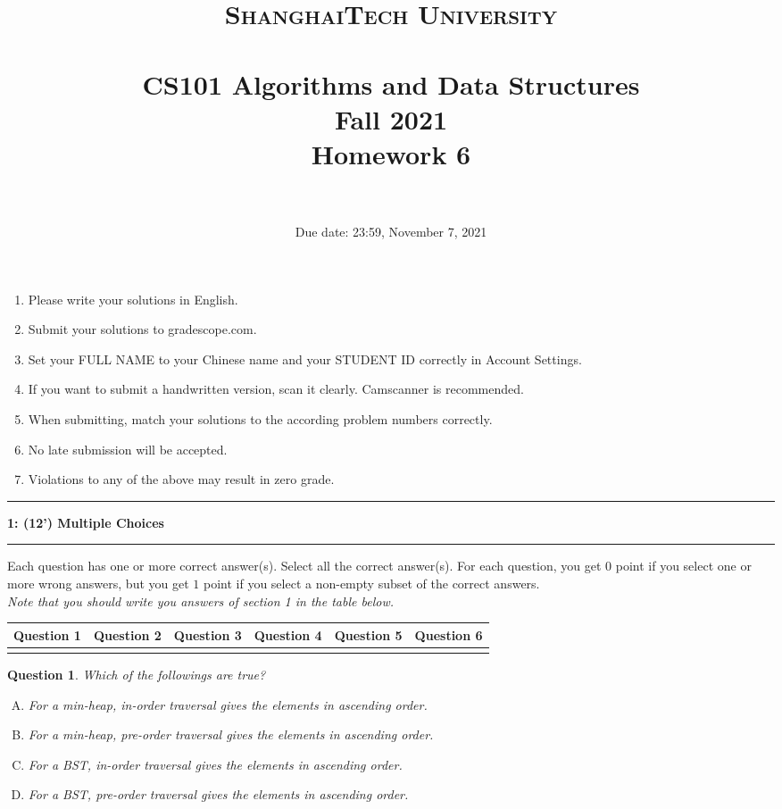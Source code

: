 \documentclass[10.5pt]{article}
\title{
	\normalfont \normalsize
	\textsc{ShanghaiTech University} \\ [25pt]
	\horrule{0.5pt} \\[0.4cm] %
	\huge CS101 Algorithms and Data Structures\\ %
	\LARGE Fall 2021\\
	\LARGE Homework 6\\
	\horrule{2pt} \\[0.5cm] %
}
\author{}
\date{Due date: 23:59, November 7, 2021}
\newcommand\question[2]{\vspace{.25in}\hrule\textbf{#1: #2}\vspace{.5em}\hrule\vspace{.10in}}
\newtheorem{Q}{Question}
\begin{document}
	
	\maketitle
	\thispagestyle{firstpage}
	\vspace{3ex}
	
	\begin{enumerate}
		\item Please write your solutions in English. 
		
		\item Submit your solutions to gradescope.com.  
		
		\item Set your FULL NAME to your Chinese name and your STUDENT ID correctly in Account Settings. 
		
		\item If you want to submit a handwritten version, scan it clearly. Camscanner is recommended. 
		
		\item When submitting, match your solutions to the according problem numbers correctly. 
		
		\item No late submission will be accepted.
		
		\item Violations to any of the above may result in zero grade. 
	\end{enumerate}
	\newpage


\question{1}{(12') Multiple Choices}
	Each question has one or more correct answer(s). Select all the correct answer(s). For each question, you get $0$ point if you select one or more wrong answers, but you get $1$ point if you select a non-empty subset of the correct answers.\\
\textit{Note that you should write you answers of section 1 in the table below.}

\begin{table}[htbp]
	\begin{tabular}{|p{2cm}|p{2cm}|p{2cm}|p{2cm}|p{2cm}|p{2cm}|}
		\hline 
		Question 1 & Question 2 & Question 3 & Question 4 & Question 5 & Question 6  \\ 
		\hline 
		&  & & & &  \\ 
		\hline 
	\end{tabular} 
\end{table}

\begin{Q}
	Which of the followings are true? 
	\begin{enumerate}[(A)]
		\item For a min-heap, in-order traversal gives the elements in ascending order.
		\item For a min-heap, pre-order traversal gives the elements in ascending order.
		\item For a BST, in-order traversal gives the elements in ascending order.
		\item For a BST, pre-order traversal gives the elements in ascending order.
	\end{enumerate}
\end{Q}
\end{document}
